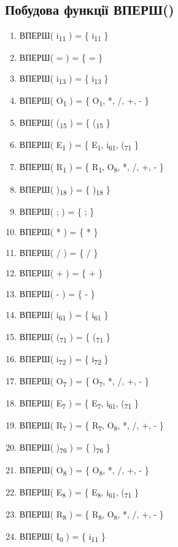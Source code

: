 \subsection{Побудова функції ВПЕРШ()}
\begin{enumerate}
  \item ВПЕРШ( i\textsubscript{11} ) = \{ i\textsubscript{11} \} 
  \item ВПЕРШ( = ) = \{ = \} 
  \item ВПЕРШ( i\textsubscript{13} ) = \{ i\textsubscript{13} \} 
  \item ВПЕРШ( O\textsubscript{1} ) = \{ O\textsubscript{1}, *, /, +, - \} 
  \item ВПЕРШ( (\textsubscript{15} ) = \{ (\textsubscript{15} \} 
  \item ВПЕРШ( E\textsubscript{1} ) = \{ E\textsubscript{1}, i\textsubscript{61}, (\textsubscript{71} \} 
  \item ВПЕРШ( R\textsubscript{1} ) = \{ R\textsubscript{1}, O\textsubscript{8}, *, /, +, - \} 
  \item ВПЕРШ( )\textsubscript{18} ) = \{ )\textsubscript{18} \} 
  \item ВПЕРШ( ; ) = \{ ; \} 

  \item ВПЕРШ( * ) = \{ * \} 
  \item ВПЕРШ( / ) = \{ / \} 
  \item ВПЕРШ( + ) = \{ + \} 
  \item ВПЕРШ( - ) = \{ - \} 
  \item ВПЕРШ( i\textsubscript{61} ) = \{ i\textsubscript{61} \} 

  \item ВПЕРШ( (\textsubscript{71} ) = \{ (\textsubscript{71} \} 
  \item ВПЕРШ( i\textsubscript{72} ) = \{ i\textsubscript{72} \} 
  \item ВПЕРШ( O\textsubscript{7} ) = \{ O\textsubscript{7}, *, /, +, - \}
  \item ВПЕРШ( E\textsubscript{7} ) = \{ E\textsubscript{7}, i\textsubscript{61}, (\textsubscript{71} \} 
  \item ВПЕРШ( R\textsubscript{7} ) = \{ R\textsubscript{7}, O\textsubscript{8}, *, /, +, - \} 
  \item ВПЕРШ( )\textsubscript{76} ) = \{ )\textsubscript{76} \} 

  \item ВПЕРШ( O\textsubscript{8} ) = \{ O\textsubscript{8}, *, /, +, - \}
  \item ВПЕРШ( E\textsubscript{8} ) = \{ E\textsubscript{8}, i\textsubscript{61}, (\textsubscript{71} \} 
  \item ВПЕРШ( R\textsubscript{8} ) = \{ R\textsubscript{8}, O\textsubscript{8}, *, /, +, - \} 

  \item ВПЕРШ( I\textsubscript{0} ) = \{ i\textsubscript{11} \} 
\end{enumerate}

